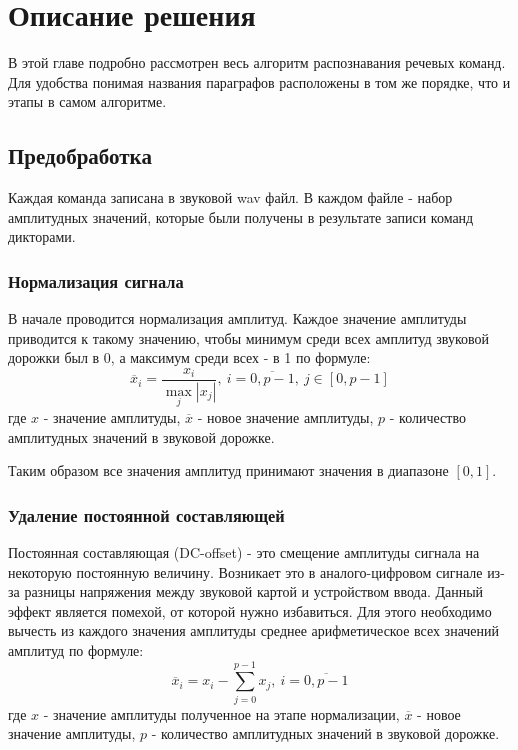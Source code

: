 \section{Описание решения}
В этой главе подробно рассмотрен весь алгоритм распознавания речевых команд. Для удобства понимая названия параграфов расположены в том же порядке, что и этапы в самом алгоритме.

\subsection{Предобработка}
Каждая команда записана в звуковой wav файл. В каждом файле - набор амплитудных значений, которые были получены в результате записи команд дикторами. 

\subsubsection{Нормализация сигнала}
В начале проводится нормализация амплитуд. Каждое значение амплитуды приводится к такому значению, чтобы минимум среди всех амплитуд звуковой дорожки был в 0, а максимум среди всех - в 1 по формуле:
\begin{equation}
	\overline{x}_i=\dfrac{x_i}{\max_{j} |x_j|},~i=\overline{0, p-1},~j \in [0, p-1]
\end{equation}
где $x$ - значение амплитуды, $\overline{x}$ - новое значение амплитуды, $p$ - количество амплитудных значений в звуковой дорожке.

Таким образом все значения амплитуд принимают значения в диапазоне $[0,1]$.

\subsubsection{Удаление постоянной составляющей}
Постоянная составляющая (DC-offset) - это смещение амплитуды сигнала на некоторую постоянную величину. Возникает это в аналого-цифровом сигнале из-за разницы напряжения между звуковой картой и устройством ввода. Данный эффект является помехой, от которой нужно избавиться. Для этого необходимо вычесть из каждого значения амплитуды среднее арифметическое всех значений амплитуд по формуле:
\begin{equation}
\overline{x}_i=x_i - \sum_{j=0}^{p-1} x_j,~i=\overline{0, p-1}
\end{equation}
где $x$ - значение амплитуды полученное на этапе нормализации, $\overline{x}$ - новое значение амплитуды, $p$ - количество амплитудных значений в звуковой дорожке.

